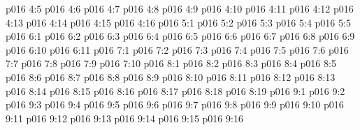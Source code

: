 \vs p016 4:5 
\vs p016 4:6 
\vs p016 4:7 
\vs p016 4:8 \pc 
\vs p016 4:9 
\vs p016 4:10 
\vs p016 4:11 
\vs p016 4:12 
\vs p016 4:13 
\vs p016 4:14 
\vs p016 4:15 
\vs p016 4:16 \pc 
{}
\vs p016 5:1 
\vs p016 5:2 
\vs p016 5:3 
\vs p016 5:4 
\vs p016 5:5 
\vs p016 6:1 
\vs p016 6:2 
\vs p016 6:3 
\vs p016 6:4 \pc 
\vs p016 6:5 
\vs p016 6:6 
\vs p016 6:7 
\vs p016 6:8 
\vs p016 6:9 \pc 
\vs p016 6:10 \pc 
\vs p016 6:11 
\vs p016 7:1 
\vs p016 7:2 
\vs p016 7:3 
\vs p016 7:4 
\vs p016 7:5 
\vs p016 7:6 \pc 
\vs p016 7:7 
\vs p016 7:8 \pc 
\vs p016 7:9 \pc 
\vs p016 7:10 
\vs p016 8:1 
\vs p016 8:2 
\vs p016 8:3 
\vs p016 8:4 
\vs p016 8:5 \pc 
\vs p016 8:6 
\vs p016 8:7 \pc 
\vs p016 8:8 
\vs p016 8:9 
\vs p016 8:10 
\vs p016 8:11 
\vs p016 8:12 
\vs p016 8:13 
\vs p016 8:14 
\vs p016 8:15 \pc 
\vs p016 8:16 
\vs p016 8:17 
\vs p016 8:18 
\vs p016 8:19 \pc 
{}
\vs p016 9:1 
\vs p016 9:2 
\vs p016 9:3 
\vs p016 9:4 \pc 
\vs p016 9:5 
\vs p016 9:6 
\vs p016 9:7 \pc 
\vs p016 9:8 
\vs p016 9:9 
\vs p016 9:10 
\vs p016 9:11 
\vs p016 9:12 
\vs p016 9:13 
\vs p016 9:14 \pc 
\vs p016 9:15 
\vsetoff
\vs p016 9:16 
\quizlink
